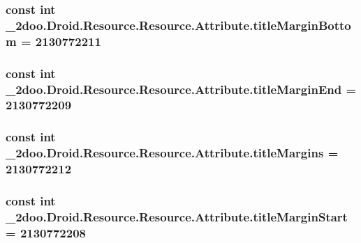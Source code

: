 \hypertarget{class__2doo_1_1_droid_1_1_resource_1_1_attribute_7059f1dadd9574d512669b5cc611fc40}{
\subsubsection[{titleMarginBottom}]{\setlength{\rightskip}{0pt plus 5cm}const int \_\-2doo.Droid.Resource.Resource.Attribute.titleMarginBottom = 2130772211}}
\label{class__2doo_1_1_droid_1_1_resource_1_1_attribute_7059f1dadd9574d512669b5cc611fc40}


\hypertarget{class__2doo_1_1_droid_1_1_resource_1_1_attribute_4d372eac635ff9735220f04fcf98a518}{
\subsubsection[{titleMarginEnd}]{\setlength{\rightskip}{0pt plus 5cm}const int \_\-2doo.Droid.Resource.Resource.Attribute.titleMarginEnd = 2130772209}}
\label{class__2doo_1_1_droid_1_1_resource_1_1_attribute_4d372eac635ff9735220f04fcf98a518}


\hypertarget{class__2doo_1_1_droid_1_1_resource_1_1_attribute_2daa3a98caebc5b0a440f6570fbb9b1c}{
\subsubsection[{titleMargins}]{\setlength{\rightskip}{0pt plus 5cm}const int \_\-2doo.Droid.Resource.Resource.Attribute.titleMargins = 2130772212}}
\label{class__2doo_1_1_droid_1_1_resource_1_1_attribute_2daa3a98caebc5b0a440f6570fbb9b1c}


\hypertarget{class__2doo_1_1_droid_1_1_resource_1_1_attribute_3598a288ee5096fd03f3f74dcb24e462}{
\subsubsection[{titleMarginStart}]{\setlength{\rightskip}{0pt plus 5cm}const int \_\-2doo.Droid.Resource.Resource.Attribute.titleMarginStart = 2130772208}}
\label{class__2doo_1_1_droid_1_1_resource_1_1_attribute_3598a288ee5096fd03f3f74dcb24e462}


